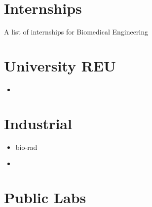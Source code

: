 \documentclass[article]{deedy-resume}
\begin{document}
\section{\faSuitcase \hspace{4mm} Internships}
A list of internships for Biomedical Engineering
\section{\faUniversity \hspace{4mm} University REU} 
\begin{itemize}
	\item 
\end{itemize}
\section{\faCogs \hspace{4mm} Industrial}
\begin{itemize}
\item bio-rad
\item 	
\end{itemize}		
\section{\faFlag \hspace{4mm} Public Labs}
\begin{itemize}

\end{itemize}
\end{document}
